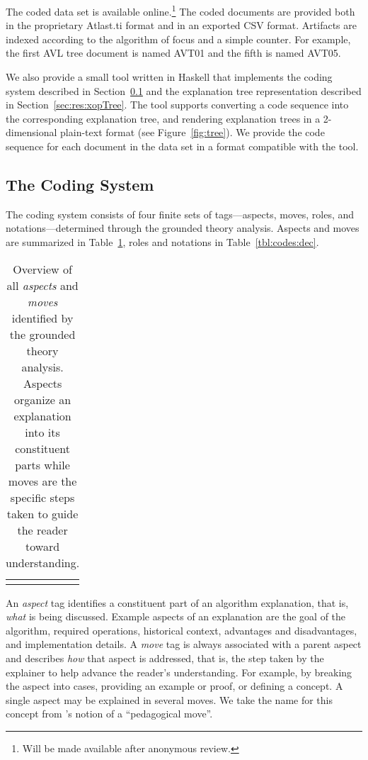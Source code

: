 \documentclass[sigconf]{acmart}
\begin{document}
The coded data set is available online.\footnote{Will be made available after
anonymous review.} The coded documents are provided both in the proprietary
Atlast.ti format and in an exported CSV format.
%
Artifacts are indexed according to the algorithm of focus and a simple counter.
For example, the first AVL tree document is named AVT01 and the fifth is named
AVT05.


We also provide a small tool written in Haskell that implements the coding
system described in Section~\ref{sec:res:sys} and the explanation tree
representation described in Section~\ref{sec:res:xopTree}. The tool supports
converting a code sequence into the corresponding explanation tree, and
rendering explanation trees in a 2-dimensional plain-text format (see
Figure~\ref{fig:tree}).
%
We provide the code sequence for each document in the data set in a format
compatible with the tool.


\subsection{The Coding System}
\label{sec:res:sys}

The coding system consists of four finite sets of tags---aspects, moves, roles,
and notations---determined through the grounded theory analysis. Aspects and
moves are summarized in Table~\ref{tbl:codes:main}, roles and notations in
Table~\ref{tbl:codes:dec}.


\begin{table}
\begin{tabular}{ll}

\\[-1.5ex]

\\[-1.5ex]
\end{tabular}
\caption{Overview of all \emph{aspects} and \emph{moves} identified by the grounded theory
analysis. Aspects organize an explanation into its constituent parts while
moves are the specific steps taken to guide the reader toward understanding.}
\label{tbl:codes:main}
\end{table}


An \emph{aspect} tag identifies a constituent part of an algorithm explanation,
that is, \emph{what} is being discussed. Example aspects of an explanation are
the goal of the algorithm, required operations, historical context, advantages
and disadvantages, and implementation details.
%
A \emph{move} tag is always associated with a parent aspect and describes
\emph{how} that aspect is addressed, that is, the step taken by the explainer
to help advance the reader's understanding. For example, by breaking the aspect
into cases, providing an example or proof, or defining a concept. A single
aspect may be explained in several moves. We take the name for this concept
from \citet{bellack1966language}'s notion of a ``pedagogical move''.
\end{document}
